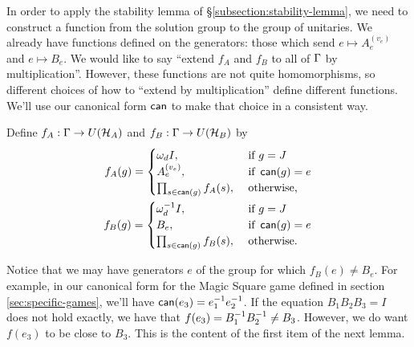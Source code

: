 In order to apply the stability lemma of \S \ref{subsection:stability-lemma}, we need to construct a function from the solution group to the group of unitaries. 
We already have functions defined on the generators: those which send $e\mapsto A_e^{(v_e)}$ and $e\mapsto B_e$. We would like to say ``extend $f_A$ and $f_B$ to all of $\Gamma$ by multiplication''. However, these functions are not quite homomorphisms, so different choices of how to ``extend by multiplication'' define different functions. We'll use our canonical form $\operatorname*{\mathsf{can}}$ to make that choice in a consistent way. 
\begin{definition}
\label{def:4.19}
	Define $f_A:\Gamma\to U(\mathcal H_A)$ and $f_B:\Gamma\to U(\mathcal H_B)$ by
	\begin{align}
		f_A(g) = \begin{cases}
			\omega_d I, &\text{ if }g=J\\
			A_e^{(v_e)}, &\text{ if }\operatorname*{\mathsf{can}}(g)=e\\
			\prod_{s\in \operatorname*{\mathsf{can}}(g)} f_A(s), &\text{ otherwise,}
		\end{cases}
		\\
		f_B(g) = \begin{cases}
			\omega_d^{-1} I, &\text{ if }g=J\\
			B_e, &\text{ if }\operatorname*{\mathsf{can}}(g)=e\\
			\prod_{s\in \operatorname*{\mathsf{can}}(g)} f_B(s), &\text{ otherwise.}
		\end{cases}
	\end{align}
\end{definition}
Notice that we may have generators $e$ of the group for which $f_B(e) \neq B_e$. For example, in our canonical form for the Magic Square game defined in section \ref{sec:specific-games}, we'll have $\operatorname*{\mathsf{can}}(e_3) = e_1^{-1}e_2^{-1}$. If the equation $B_1B_2B_3 = I$ does not hold exactly, we have that $f(e_3) = B_1^{-1}B_2^{-1} \neq B_3$. However, we do want $f(e_3)$ to be close to $B_3$. This is the content of the first item of the next lemma.

